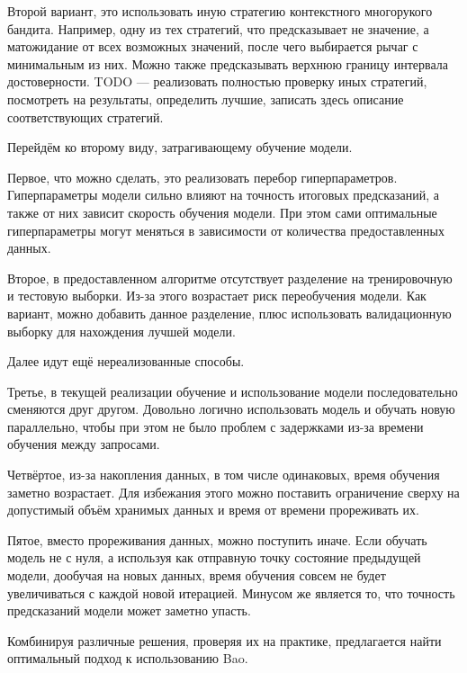 \documentclass[12pt]{article}
\begin{document}
Второй вариант, это использовать иную стратегию контекстного многорукого бандита. Например, одну из тех стратегий, что предсказывает не значение, а матожидание от всех возможных значений, после чего выбирается рычаг с минимальным из них. Можно также предсказывать верхнюю границу интервала достоверности. TODO — реализовать полностью проверку иных стратегий, посмотреть на результаты, определить лучшие, записать здесь описание соответствующих стратегий.

Перейдём ко второму виду, затрагивающему обучение модели.

Первое, что  можно сделать, это реализовать перебор гиперпараметров. Гиперпараметры модели сильно влияют на точность итоговых предсказаний, а также от них зависит скорость обучения модели. При этом сами оптимальные гиперпараметры могут меняться в зависимости от количества предоставленных данных.

Второе, в предоставленном алгоритме отсутствует разделение на тренировочную и тестовую выборки. Из-за этого возрастает риск переобучения модели. Как вариант, можно добавить данное разделение, плюс использовать валидационную выборку для нахождения лучшей модели.

Далее идут ещё нереализованные способы.

Третье, в текущей реализации обучение и использование модели последовательно сменяются друг другом. Довольно логично использовать модель и обучать новую параллельно, чтобы при этом не было проблем с задержками из-за времени обучения между запросами.

Четвёртое, из-за накопления данных, в том числе одинаковых, время обучения заметно возрастает. Для избежания этого можно поставить ограничение сверху на допустимый объём хранимых данных и время от времени прореживать их.

Пятое, вместо прореживания данных, можно поступить иначе. Если обучать модель не с нуля, а используя как отправную точку состояние предыдущей модели, дообучая на новых данных, время обучения совсем не будет увеличиваться с каждой новой итерацией. Минусом же является то, что точность предсказаний модели может заметно упасть.

Комбинируя различные решения, проверяя их на практике, предлагается найти оптимальный подход к использованию Bao.



\end{document}

